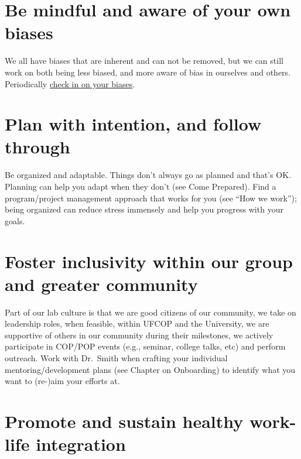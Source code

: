 \documentclass[
  letterpaper,
  DIV=11,
  numbers=noendperiod]{scrreprt}
\begin{document}
\hypertarget{be-mindful-and-aware-of-your-own-biases}{%
\section{Be mindful and aware of your own
biases}\label{be-mindful-and-aware-of-your-own-biases}}

We all have biases that are inherent and can not be removed, but we can
still work on both being less biased, and more aware of bias in
ourselves and others. Periodically
\href{https://medium.com/better-humans/cognitive-bias-cheat-sheet-55a472476b18}{check
in on your biases}.

\hypertarget{plan-with-intention-and-follow-through}{%
\section{Plan with intention, and follow
through}\label{plan-with-intention-and-follow-through}}

Be organized and adaptable. Things don't always go as planned and that's
OK. Planning can help you adapt when they don't (see Come Prepared).
Find a program/project management approach that works for you (see ``How
we work''); being organized can reduce stress immensely and help you
progress with your goals.

\hypertarget{foster-inclusivity-within-our-group-and-greater-community}{%
\section{Foster inclusivity within our group and greater
community}\label{foster-inclusivity-within-our-group-and-greater-community}}

Part of our lab culture is that we are good citizens of our community,
we take on leadership roles, when feasible, within UFCOP and the
University, we are supportive of others in our community during their
milestones, we actively participate in COP/POP events (e.g., seminar,
college talks, etc) and perform outreach. Work with Dr.~Smith when
crafting your individual mentoring/development plans (see Chapter on
Onboarding) to identify what you want to (re-)aim your efforts at.

\hypertarget{promote-and-sustain-healthy-work-life-integration}{%
\section{Promote and sustain healthy work-life
integration}\label{promote-and-sustain-healthy-work-life-integration}}
\end{document}
